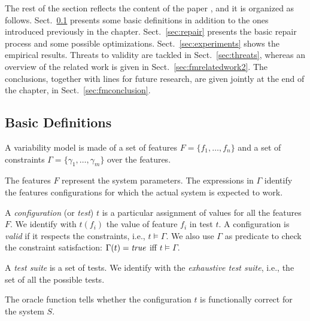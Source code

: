 \begin{tikzborder}{\cite{Gargantini16:validation}}
\begin{tikzborder}{\cite{gargantini_combinatorial_2017}}
\begin{tikzborder}{\cite{garn2019}}
\begin{tikzborder}{\cite{arcaini2019achieving}}
	The rest of the section reflects the content of the paper \cite{arcaini2019varivolution}, and it is organized as follows. Sect.~\ref{sec:basic} presents some basic definitions in addition to the ones introduced previously in the chapter. Sect.~\ref{sec:repair} presents the basic repair process and some possible optimizations. Sect.~\ref{sec:experiments} shows the empirical results. Threats to validity are tackled in Sect.~\ref{sec:threats}, whereas an overview of the related work is given in Sect.~\ref{sec:fmrelatedwork2}. The conclusions, together with lines for future research, are given jointly at the end of the chapter, in Sect.~\ref{sec:fmconclusion}.
	
	\subsection{Basic Definitions}\label{sec:basic}
	
	\begin{tikzborder}{\cite{arcaini2019varivolution}}
		\begin{mydef}\label{def:varModel}
			A variability model \m is made of a set of features $F=\{f_1, \ldots, f_n\}$ and a set of constraints $\Gamma = \{\gamma_1,\ldots, \gamma_m\}$ over the features.
		\end{mydef}
		
		The features $F$ represent the system parameters. The expressions in $\Gamma$ identify the features configurations for which the actual system is expected to work.
		
		\begin{mydef}[Configuration]\label{def:configuration}
			A \emph{configuration} (or \emph{test}) $t$ is a particular assignment of values for all the features $F$. We identify with $t(f_i)$ the value of feature $f_i$ in test $t$. A configuration is {\it valid} if it respects the constraints, i.e., $t \models \Gamma$. We also use $\Gamma$ as predicate to check the constraint satisfaction: $\Gamma(t) = \mathit{true}$ iff $t \models \Gamma$.
		\end{mydef}
		
		\begin{mydef}\label{def:testSuite}
			A \emph{test suite} \testSuite is a set of tests. We identify with \exTestSuite the \emph{exhaustive test suite}, i.e., the set of all the possible tests.
		\end{mydef}
		
		\begin{mydef}[Oracle]\label{def:oracle}
			The oracle function \oraclet tells whether the configuration $t$ is functionally correct for the system $S$.
		\end{mydef}
		

\end{tikzborder}
\end{tikzborder}
\end{tikzborder}
\end{tikzborder}
\end{tikzborder}
